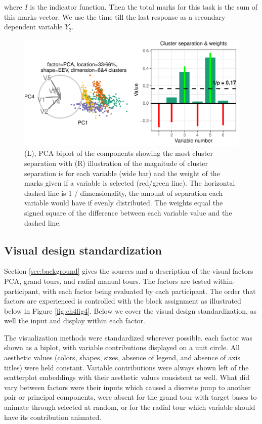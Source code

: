 \documentclass{monashthesis}
\begin{document}
where \(I\) is the indicator function. Then the total marks for this task is the sum of this marks vector. We use the time till the last response as a secondary dependent variable \(Y_2\).

\begin{figure}

{\centering \includegraphics[width=1\linewidth,]{./figures_from_script/ch4_fig3_accuracy_measure} 

}

\caption{(L), PCA biplot of the components showing the most cluster separation with (R) illustration of the magnitude of cluster separation is for each variable (wide bar) and the weight of the marks given if a variable is selected (red/green line). The horizontal dashed line is 1 / dimensionality, the amount of separation each variable would have if evenly distributed. The weights equal the signed square of the difference between each variable value and the dashed line.}\label{fig:ch4fig3}
\end{figure}

\hypertarget{sec:standardization}{%
\subsection{Visual design standardization}\label{sec:standardization}}

Section \ref{sec:background} gives the sources and a description of the visual factors PCA, grand tours, and radial manual tours. The factors are tested within-participant, with each factor being evaluated by each participant. The order that factors are experienced is controlled with the block assignment as illustrated below in Figure \ref{fig:ch4fig4}. Below we cover the visual design standardization, as well the input and display within each factor.

The visualization methods were standardized wherever possible. each factor was shown as a biplot, with variable contributions displayed on a unit circle. All aesthetic values (colors, shapes, sizes, absence of legend, and absence of axis titles) were held constant. Variable contributions were always shown left of the scatterplot embeddings with their aesthetic values consistent as well. What did vary between factors were their inputs which caused a discrete jump to another pair or principal components, were absent for the grand tour with target bases to animate through selected at random, or for the radial tour which variable should have its contribution animated.
\end{document}
